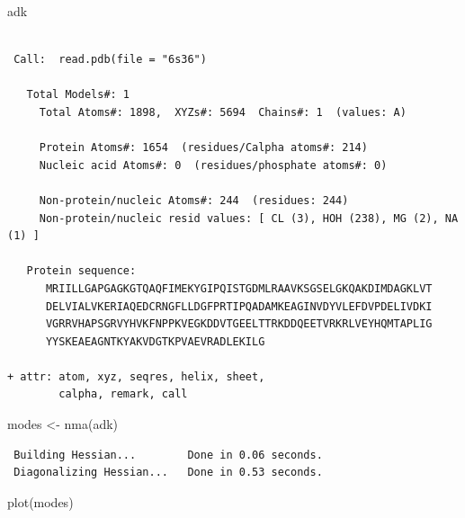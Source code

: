 \documentclass[
  letterpaper,
  DIV=11,
  numbers=noendperiod]{scrartcl}
\newenvironment{Shaded}{\begin{snugshade}}{\end{snugshade}}
\newcommand{\FunctionTok}[1]{\textcolor[rgb]{0.28,0.35,0.67}{#1}}
\newcommand{\NormalTok}[1]{\textcolor[rgb]{0.00,0.23,0.31}{#1}}
\newcommand{\OtherTok}[1]{\textcolor[rgb]{0.00,0.23,0.31}{#1}}
\begin{document}
\begin{Shaded}
\begin{Highlighting}[]
\NormalTok{adk}
\end{Highlighting}
\end{Shaded}

\begin{verbatim}

 Call:  read.pdb(file = "6s36")

   Total Models#: 1
     Total Atoms#: 1898,  XYZs#: 5694  Chains#: 1  (values: A)

     Protein Atoms#: 1654  (residues/Calpha atoms#: 214)
     Nucleic acid Atoms#: 0  (residues/phosphate atoms#: 0)

     Non-protein/nucleic Atoms#: 244  (residues: 244)
     Non-protein/nucleic resid values: [ CL (3), HOH (238), MG (2), NA (1) ]

   Protein sequence:
      MRIILLGAPGAGKGTQAQFIMEKYGIPQISTGDMLRAAVKSGSELGKQAKDIMDAGKLVT
      DELVIALVKERIAQEDCRNGFLLDGFPRTIPQADAMKEAGINVDYVLEFDVPDELIVDKI
      VGRRVHAPSGRVYHVKFNPPKVEGKDDVTGEELTTRKDDQEETVRKRLVEYHQMTAPLIG
      YYSKEAEAGNTKYAKVDGTKPVAEVRADLEKILG

+ attr: atom, xyz, seqres, helix, sheet,
        calpha, remark, call
\end{verbatim}

\begin{Shaded}
\begin{Highlighting}[]
\NormalTok{modes }\OtherTok{\textless{}{-}} \FunctionTok{nma}\NormalTok{(adk)}
\end{Highlighting}
\end{Shaded}

\begin{verbatim}
 Building Hessian...        Done in 0.06 seconds.
 Diagonalizing Hessian...   Done in 0.53 seconds.
\end{verbatim}

\begin{Shaded}
\begin{Highlighting}[]
\FunctionTok{plot}\NormalTok{(modes)}
\end{Highlighting}
\end{Shaded}
\end{document}
